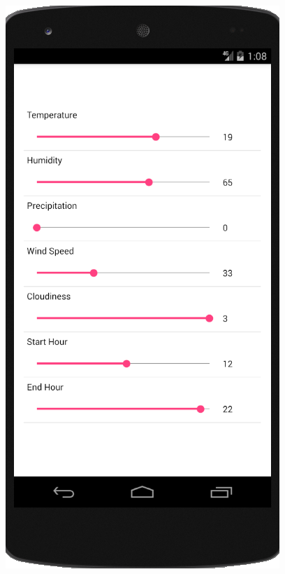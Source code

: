 \documentclass[11pt, a4paper, oneside]{scrartcl}
\begin{document}
\includegraphics[scale=0.7]{screen_pref.png}
\end{document}

